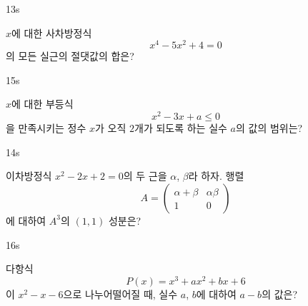 \documentclass[10pt]{article}
\begin{document}
\begin{pagepair}
\noindent
\begin{minipage}[t][\probboxheight][t]{0.46\linewidth}
\begin{problem}{13}{s}
\par\smallskip
$x$에 대한 사차방정식
\[ x^4 - 5x^2 + 4 = 0 \]
의 모든 실근의 절댓값의 합은?
\begin{choices}
\end{choices}
\end{problem}
\end{minipage}\hfill
\begin{minipage}[t][\probboxheight][t]{0.46\linewidth}
\begin{problem}{15}{s}
\par\smallskip
$x$에 대한 부등식
\[ x^2 - 3x + a \le 0 \]
을 만족시키는 정수 $x$가 오직 $2$개가 되도록 하는 실수 $a$의 값의 범위는?
\begin{choices}
\end{choices}
\end{problem}
\end{minipage}
\par\vspace{4mm}
\noindent
\begin{minipage}[t][\probboxheight][t]{0.46\linewidth}
\begin{problem}{14}{s}
\par\smallskip
이차방정식 $x^2 - 2x + 2 = 0$의 두 근을 $\alpha$, $\beta$라 하자. 행렬
\[ A = \begin{pmatrix} \alpha + \beta & \alpha \beta \\ 1 & 0 \end{pmatrix} \]
에 대하여 $A^3$의 $(1, 1)$ 성분은?
\begin{choices}
\end{choices}
\end{problem}
\end{minipage}\hfill
\begin{minipage}[t][\probboxheight][t]{0.46\linewidth}
\begin{problem}{16}{s}
\par\smallskip
다항식
\[ P(x) = x^3 + ax^2 + bx + 6 \]
이 $x^2 - x - 6$으로 나누어떨어질 때, 실수 $a$, $b$에 대하여 $a - b$의 값은?
\begin{choices}
\end{choices}
\end{problem}
\end{minipage}
\end{pagepair}
\end{document}
